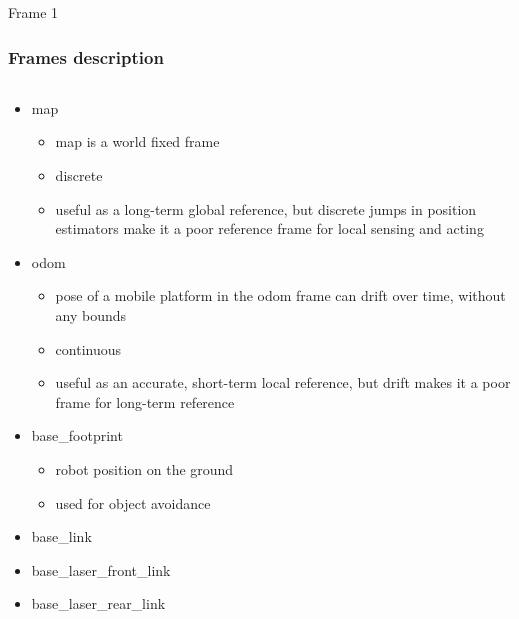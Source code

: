 
\begin{frame}{Frame 1}
\frametitle {Frames description}
 
 \begin{columns}
 \begin{column}{0.5\textwidth}
		\begin{itemize}
		\item map
 			 \begin{itemize}
  				\item map is a world fixed frame
 				 \item  discrete
 				 \item useful as a long-term global reference, but discrete jumps in position estimators make it a poor reference frame for local sensing and acting
  			\end{itemize}
		\item odom
		\begin{itemize}
			\item  pose of a mobile platform in the odom frame can drift over time, without any bounds
			\item continuous 
			\item  useful as an accurate, short-term local reference, but drift makes it a poor frame for long-term reference
		\end{itemize}
	\item base\_footprint
		\begin{itemize}
		\item robot position on the ground
		\item used for object avoidance
		\end{itemize}
	\item base\_link
	\item base\_laser\_front\_link
	\item base\_laser\_rear\_link
	\end{itemize}
\end{column} 
 


\end{columns}
\end{frame}
